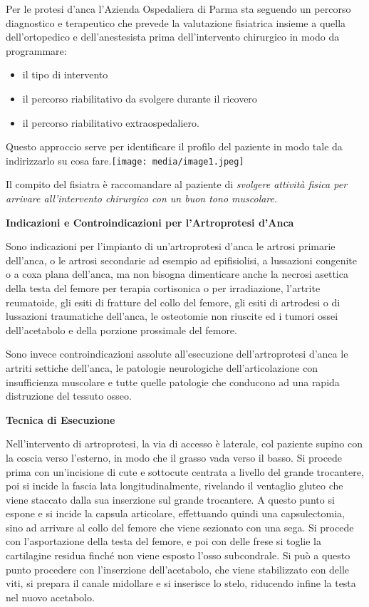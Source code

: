 \documentclass[]{article}
\begin{document}
Per le protesi d'anca l'Azienda Ospedaliera di Parma sta seguendo un
percorso diagnostico e terapeutico che prevede la valutazione fisiatrica
insieme a quella dell'ortopedico e dell'anestesista prima
dell'intervento chirurgico in modo da programmare:

\begin{itemize}
\item
  il tipo di intervento
\end{itemize}

\begin{itemize}
\item
  il percorso riabilitativo da svolgere durante il ricovero
\item
  il percorso riabilitativo extraospedaliero.
\end{itemize}

Questo approccio serve per identificare il profilo del paziente in modo
tale da indirizzarlo su cosa
fare.\texttt{[image: media/image1.jpeg]}

Il compito del fisiatra è raccomandare al paziente di \emph{svolgere
attività fisica per arrivare all'intervento chirurgico con un buon tono
muscolare}.

\textbf{Indicazioni e Controindicazioni per l'Artroprotesi d'Anca}

Sono indicazioni per l'impianto di un'artroprotesi d'anca le artrosi
primarie dell'anca, o le artrosi secondarie ad esempio ad epifisiolisi,
a lussazioni congenite o a coxa plana dell'anca, ma non bisogna
dimenticare anche la necrosi asettica della testa del femore per terapia
cortisonica o per irradiazione, l'artrite reumatoide, gli esiti di
fratture del collo del femore, gli esiti di artrodesi o di lussazioni
traumatiche dell'anca, le osteotomie non riuscite ed i tumori ossei
dell'acetabolo e della porzione prossimale del femore.

Sono invece controindicazioni assolute all'esecuzione dell'artroprotesi
d'anca le artriti settiche dell'anca, le patologie neurologiche
dell'articolazione con insufficienza muscolare e tutte quelle patologie
che conducono ad una rapida distruzione del tessuto osseo.

\textbf{Tecnica di Esecuzione}

Nell'intervento di artroprotesi, la via di accesso è laterale, col
paziente supino con la coscia verso l'esterno, in modo che il grasso
vada verso il basso. Si procede prima con un'incisione di cute e
sottocute centrata a livello del grande trocantere, poi si incide la
fascia lata longitudinalmente, rivelando il ventaglio gluteo che viene
staccato dalla sua inserzione sul grande trocantere. A questo punto si
espone e si incide la capsula articolare, effettuando quindi una
capsulectomia, sino ad arrivare al collo del femore che viene sezionato
con una sega. Si procede con l'asportazione della testa del femore, e
poi con delle frese si toglie la cartilagine residua finché non viene
esposto l'osso subcondrale. Si può a questo punto procedere con
l'inserzione dell'acetabolo, che viene stabilizzato con delle viti, si
prepara il canale midollare e si inserisce lo stelo, riducendo infine la
testa nel nuovo acetabolo.
\end{document}
